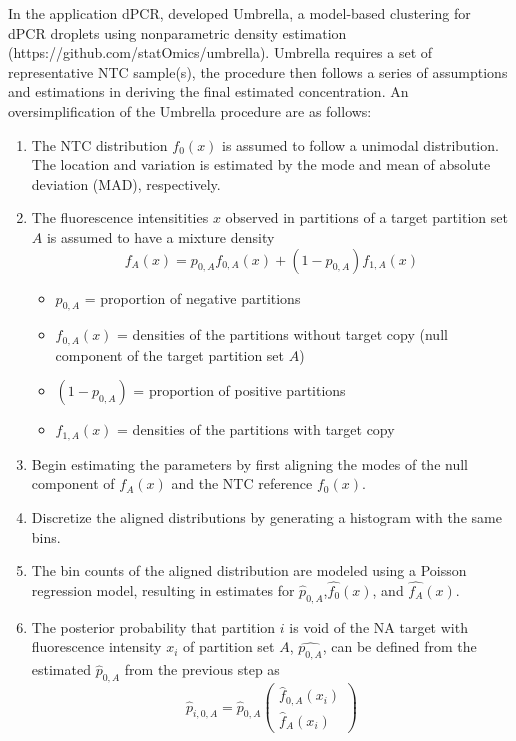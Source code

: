 In the application dPCR,  developed Umbrella, a model-based clustering for dPCR droplets using nonparametric density estimation (https://github.com/statOmics/umbrella). Umbrella requires a set of representative NTC sample(s), the procedure then follows a series of assumptions and estimations in deriving the final estimated concentration. An oversimplification of the Umbrella procedure are as follows:
\begin{enumerate}
    \item The NTC distribution \(f_0(x)\) is assumed to follow a unimodal distribution. The location and variation is estimated by the mode and mean of absolute deviation (MAD), respectively.
    \item The fluorescence intensitities \(x\) observed in partitions of a target partition set \(A\) is assumed to have a mixture density 
    \[f_A(x) = p_{0,A}f_{0,A}(x) + (1-p_{0,A})f_{1,A}(x)\]
    \begin{itemize}
        \item \(p_{0,A}\) = proportion of negative partitions
        \item \(f_{0,A}(x)\) = densities of the partitions without target copy (null component of the target partition set \(A\))
        \item \((1-p_{0,A})\) = proportion of positive partitions
        \item \(f_{1,A}(x)\) = densities of the partitions with target copy
    \end{itemize}
    \item Begin estimating the parameters by first aligning the modes of  the null component of \(f_A(x)\) and the NTC reference \(f_0(x)\).
    \item Discretize the aligned distributions by generating a histogram with the same bins.
    \item The bin counts of the aligned distribution are modeled using a Poisson regression model, resulting in estimates for \(\hat{p}_{0,A}\),\(\hat{f_{0}}(x)\), and \(\hat{f_{A}}(x)\).
    \item The posterior probability that partition \(i\) is void of the NA target with fluorescence intensity \(x_i\) of partition set \(A\), \(\hat{p_{0,A}}\), can be defined from the estimated \(\hat{p}_{0,A}\) from the previous step as
    \[ \hat{p}_{i,0,A}=\hat{p}_{0,A}\left(\begin{array}{c}\hat{f}_{0,A}(x_i)\\ \hat{f}_{A}(x_i)\end{array}\right) \]

\end{enumerate}
